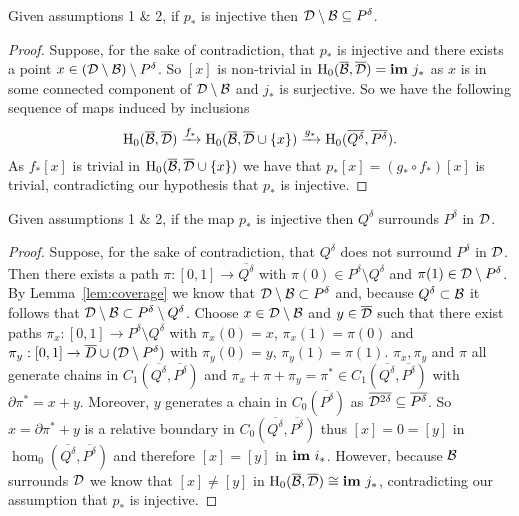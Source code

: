 \begin{lemma}\label{lem:coverage}
    Given assumptions 1 \& 2, if $p_*$ is injective then ${\mathcal{D}}\setminus{\mathcal{B}}\subseteq P^\delta$.
\end{lemma}
\begin{proof}
    Suppose, for the sake of contradiction, that $p_*$ is injective and there exists a point $x\in ({\mathcal{D}}\setminus{\mathcal{B}})\setminus P^\delta$.
    So $[x]$ is non-trivial in $\mathrm{H}_0(\overline{{\mathcal{B}}},\overline{{\mathcal{D}}}) = \mathbf{im}~j_*$ as $x$ is in some connected component of ${\mathcal{D}}\setminus{\mathcal{B}}$ and $j_*$ is surjective.
    So we have the following sequence of maps induced by inclusions
    \[ \mathrm{H}_0(\overline{{\mathcal{B}}},\overline{{\mathcal{D}}})\xrightarrow{f_*} \mathrm{H}_0(\overline{{\mathcal{B}}},\overline{{\mathcal{D}}}\cup\{x\})\xrightarrow{g_*} \mathrm{H}_0(\overline{Q^\delta},\overline{P^\delta}).\]
    As $f_*[x]$ is trivial in $\mathrm{H}_0(\overline{{\mathcal{B}}},\overline{{\mathcal{D}}}\cup\{x\})$ we have that $p_*[x] = (g_*\circ f_*)[x]$ is trivial, contradicting our hypothesis that $p_*$ is injective.
\end{proof}

\begin{lemma}\label{lem:separate}
    Given assumptions 1 \& 2, if the map $p_*$ is injective then $Q^\delta$ surrounds $P^\delta$ in ${\mathcal{D}}$.
\end{lemma}
\begin{proof}
    Suppose, for the sake of contradiction, that $Q^\delta$ does not surround $P^\delta$ in ${\mathcal{D}}$.
    Then there exists a path $\pi : [0,1]\to\overline{Q^\delta}$ with $\pi(0)\in P^\delta\setminus Q^\delta$ and $\pi(1)\in {\mathcal{D}}\setminus P^\delta$.
    By Lemma~\ref{lem:coverage} we know that ${\mathcal{D}}\setminus{\mathcal{B}}\subset P^\delta$ and, because $Q^\delta\subset{\mathcal{B}}$ it follows that ${\mathcal{D}}\setminus{\mathcal{B}}\subset P^\delta\setminus Q^\delta$.
    Choose $x\in{\mathcal{D}}\setminus {\mathcal{B}}$ and $y\in \overline{{\mathcal{D}}}$ such that there exist paths $\pi_x : [0,1]\to P^\delta\setminus Q^\delta$ with $\pi_x(0) = x$, $\pi_x(1) = \pi(0)$ and $\pi_y : [0,1]\to \overline{D}\cup ({\mathcal{D}}\setminus P^\delta)$ with $\pi_y(0) = y$, $\pi_y(1) = \pi(1)$.
    $\pi_x, \pi_y$ and $\pi$ all generate chains in $C_1(\overline{Q^\delta}, \overline{P^\delta})$ and $\pi_x + \pi + \pi_y = \pi^*\in C_1(\overline{Q^\delta}, \overline{P^\delta})$ with $\partial\pi^* = x + y$.
    Moreover, $y$ generates a chain in $C_0(\overline{P^\delta})$ as $\overline{{\mathcal{D}}^{2\delta}}\subseteq\overline{P^\delta}$.
    So $x = \partial\pi^* + y$ is a relative boundary in $C_0(\overline{Q^\delta}, \overline{P^\delta})$ thus $[x] = 0 = [y]$ in $\hom_0(\overline{Q^\delta}, \overline{P^\delta})$ and therefore $[x] = [y]$ in $\mathbf{im}~i_*$.
    However, because ${\mathcal{B}}$ surrounds ${\mathcal{D}}$ we know that $[x]\neq [y]$ in $\mathrm{H}_0(\overline{{\mathcal{B}}}, \overline{{\mathcal{D}}})\cong \mathbf{im}~j_*$, contradicting our assumption that $p_*$ is injective.
\end{proof}

